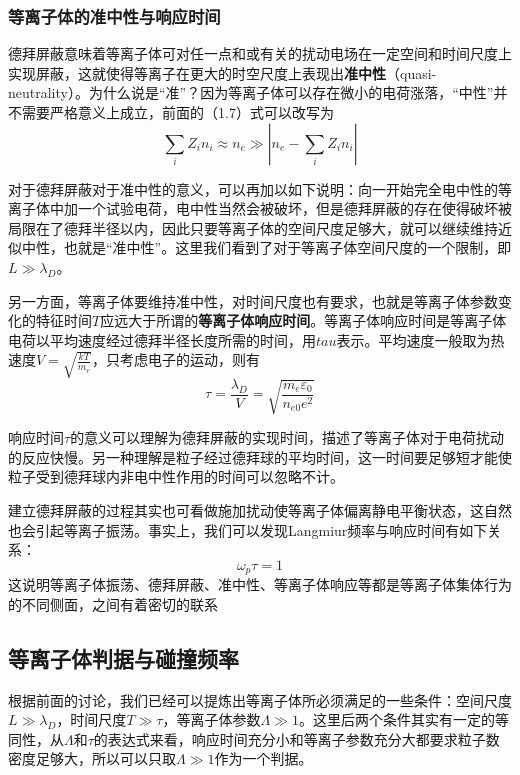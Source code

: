 			\subsubsection{等离子体的准中性与响应时间}
			\hspace{2em}德拜屏蔽意味着等离子体可对任一点和或有关的扰动电场在一定空间和时间尺度上实现屏蔽，这就使得等离子在更大的时空尺度上表现出\textbf{准中性}（quasi-neutrality）。为什么说是“准”？因为等离子体可以存在微小的电荷涨落，“中性”并不需要严格意义上成立，前面的（1.7）式可以改写为
			\begin{equation}\label{key}
			\sum_i Z_in_{i}\approx n_e\gg \left|n_e-\sum_i Z_in_{i}\right|	 
			\end{equation}
			
			对于德拜屏蔽对于准中性的意义，可以再加以如下说明：向一开始完全电中性的等离子体中加一个试验电荷，电中性当然会被破坏，但是德拜屏蔽的存在使得破坏被局限在了德拜半径以内，因此只要等离子体的空间尺度足够大，就可以继续维持近似中性，也就是“准中性”。这里我们看到了对于等离子体空间尺度的一个限制，即$L\gg \lambda_D$。
			
			另一方面，等离子体要维持准中性，对时间尺度也有要求，也就是等离子体参数变化的特征时间$T$应远大于所谓的\textbf{等离子体响应时间}。等离子体响应时间是等离子体电荷以平均速度经过德拜半径长度所需的时间，用$tau$表示。平均速度一般取为热速度$V=\sqrt{\frac{kT}{m_e}}$，只考虑电子的运动，则有
			\begin{equation}\label{key}
			\tau=\frac{\lambda_D}{V}=\sqrt{\frac{m_e\varepsilon_0}{n_{e0}e^2}}
			\end{equation}
			
			响应时间$\tau$的意义可以理解为德拜屏蔽的实现时间，描述了等离子体对于电荷扰动的反应快慢。另一种理解是粒子经过德拜球的平均时间，这一时间要足够短才能使粒子受到德拜球内非电中性作用的时间可以忽略不计。
			
			建立德拜屏蔽的过程其实也可看做施加扰动使等离子体偏离静电平衡状态，这自然也会引起等离子振荡。事实上，我们可以发现Langmiur频率与响应时间有如下关系：
			\begin{equation}\label{key}
			\omega_p \tau=1
			\end{equation}
			这说明等离子体振荡、德拜屏蔽、准中性、等离子体响应等都是等离子体集体行为的不同侧面，之间有着密切的联系
			
		\subsection{等离子体判据与碰撞频率}
		\hspace{2em}根据前面的讨论，我们已经可以提炼出等离子体所必须满足的一些条件：空间尺度$L\gg \lambda_D$，时间尺度$T\gg\tau$，等离子体参数$\varLambda\gg1$。这里后两个条件其实有一定的等同性，从$\varLambda$和$\tau$的表达式来看，响应时间充分小和等离子参数充分大都要求粒子数密度足够大，所以可以只取$\varLambda\gg1$作为一个判据。
		
